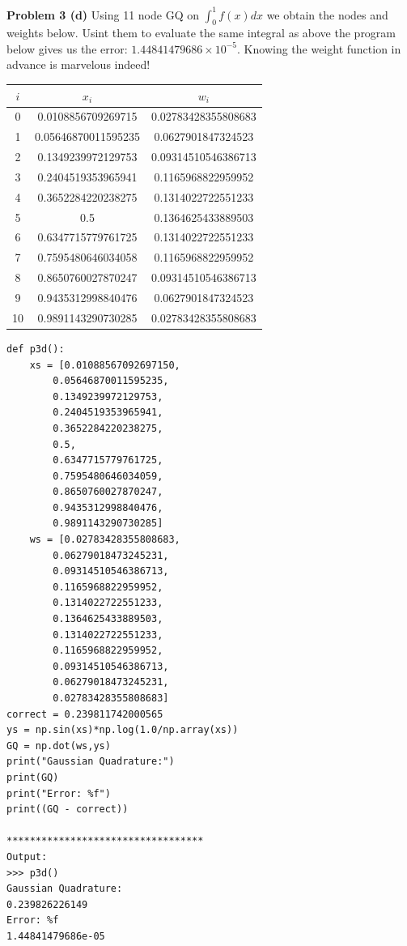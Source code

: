 \documentclass[12pt]{article}
\newcommand{\problem}[1]{\hspace{-4 ex} \large \textbf{Problem #1} }
\begin{document}
\bigbreak
\problem{3 (d)} Using 11 node GQ on $\int_0^1 f(x) dx$ we obtain the nodes and weights below. Usint them to evaluate the same integral as above the program below gives us the error: $1.44841479686\times 10^{-5}$. Knowing the weight function in advance is marvelous indeed!
\begin{center}
	\begin{tabular}{|c|c|c|}
		\hline
		$i$&$x_i$&$w_i$\\ \hline
		0&0.0108856709269715&0.02783428355808683\\ \hline
		1&0.05646870011595235&0.0627901847324523\\ \hline
		2&0.1349239972129753&0.09314510546386713\\ \hline
		3&0.2404519353965941&0.1165968822959952\\ \hline
		4&0.3652284220238275&0.1314022722551233\\ \hline
		5&0.5&0.1364625433889503\\ \hline
		6&0.6347715779761725&0.1314022722551233\\ \hline
		7&0.7595480646034058&0.1165968822959952\\ \hline
		8&0.8650760027870247&0.09314510546386713\\ \hline
		9&0.9435312998840476&0.0627901847324523\\ \hline
		10&0.9891143290730285&0.02783428355808683\\ \hline
	\end{tabular}
\end{center}
\begin{lstlisting}
def p3d():
	xs = [0.01088567092697150,
		0.05646870011595235,
		0.1349239972129753,
		0.2404519353965941,
		0.3652284220238275,
		0.5,
		0.6347715779761725,
		0.7595480646034059,
		0.8650760027870247,
		0.9435312998840476,
		0.9891143290730285]
	ws = [0.02783428355808683,
		0.06279018473245231,
		0.09314510546386713,
		0.1165968822959952,
		0.1314022722551233,
		0.1364625433889503,
		0.1314022722551233,
		0.1165968822959952,
		0.09314510546386713,
		0.06279018473245231,
		0.02783428355808683]
correct = 0.239811742000565
ys = np.sin(xs)*np.log(1.0/np.array(xs))
GQ = np.dot(ws,ys)
print("Gaussian Quadrature:")
print(GQ)
print("Error: %f")
print((GQ - correct))

**********************************
Output:
>>> p3d()
Gaussian Quadrature:
0.239826226149
Error: %f
1.44841479686e-05
\end{lstlisting}
\end{document}
